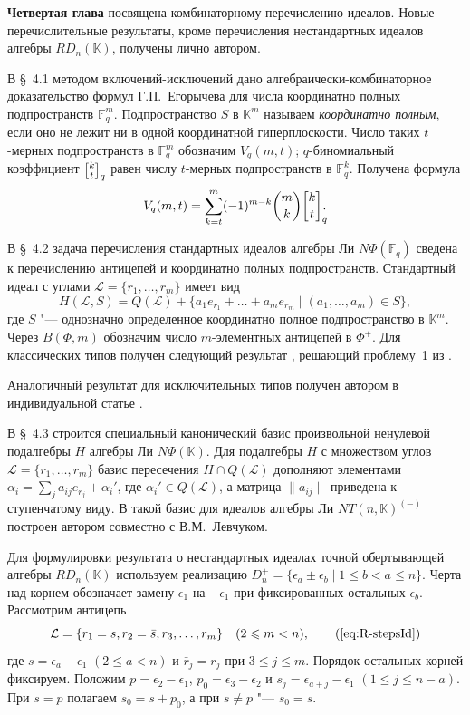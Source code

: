 \medskip

\textbf{Четвертая глава} посвящена комбинаторному перечислению идеалов.
Новые перечислительные результаты, кроме перечисления нестандартных идеалов
алгебры $RD_n(\mathbb{K})$, получены лично автором.

В \S~4.1 методом включений-исключений дано алгебраически-комбинаторное
доказательство формул Г.\:П.~Егорычева для числа координатно полных
подпространств $\mathbb{F}_q^m$. Подпространство $S$ в $\mathbb{K}^m$ называем
\emph{координатно полным}, если оно не лежит ни в одной координатной
гиперплоскости. Число таких $t$-мерных подпространств в $\mathbb{F}_q^m$
обозначим $V_q(m,t)$; $q$-биномиальный коэффициент $\qbinom{k}{t}$ равен числу
$t$-мерных подпространств в $\mathbb{F}_q^k$. Получена формула
\cite[лемма~2.3]{smj2023}
\[
    V_q(m,t) = \sum_{k=t}^{m} (-1)^{m-k} \binom{m}{k} \qbinom{k}{t}[\mathrlap].
\]

В \S~4.2 задача перечисления стандартных идеалов алгебры Ли
$N\Phi(\mathbb{F}_q)$ сведена к перечислению антицепей и координатно полных
подпространств. Стандартный идеал с углами $\mathcal{L}=\{r_1,\ldots,r_m\}$
имеет вид
\[
    H(\mathcal{L},S)=Q(\mathcal{L})+\{a_1e_{r_1}+\dots+a_me_{r_m}\mid
    (a_1,\dots,a_m)\in S\},
\]
где $S$ "--- однозначно определенное координатно полное подпространство в
$\mathbb{K}^m$. Через $B(\Phi,m)$ обозначим число $m$-элементных антицепей в
$\Phi^+$. Для классических типов получен следующий результат
\cite[теорема~1]{smj2023}, решающий проблему~1 из \cite{sigsam2001}.


Аналогичный результат для исключительных типов получен автором в индивидуальной
статье \cite[теорема~2.1]{jsfu2018}.


В \S~4.3 строится специальный канонический базис произвольной ненулевой
подалгебры $H$ алгебры Ли $N\Phi(\mathbb{K})$. Для подалгебры $H$ с множеством
углов $\mathcal{L}=\{r_1,\ldots,r_m\}$ базис пересечения $H\cap Q(\mathcal{L})$
дополняют элементами $\alpha_i=\sum_j a_{ij}e_{r_j}+\alpha_i'$, где
$\alpha_i'\in Q(\mathcal{L})$, а матрица $\|a_{ij}\|$ приведена к ступенчатому
виду. В \cite[\S~4]{vmj2015} такой базис для идеалов алгебры Ли
$NT(n,\mathbb{K})^{(-)}$ построен автором совместно с В.\:М.~Левчуком.

Для формулировки результата о нестандартных идеалах точной обертывающей алгебры
$RD_n(\mathbb{K})$ используем реализацию
$D_n^+=\{\epsilon_a\pm\epsilon_b\mid1\leq b<a\leq n\}$. Черта над корнем
обозначает замену $\epsilon_1$ на $-\epsilon_1$ при фиксированных остальных
$\epsilon_b$. Рассмотрим антицепь
\begin{equation*}
    \mathcal{L}=\{r_1=s,r_2=\bar{s},r_3,\dots,r_m\}\quad(2\leq m<n),
    \tag{\ref*{eq:R-stepsId}}
\end{equation*}
где $s=\epsilon_a-\epsilon_1$ $(2\leq a<n)$ и $\bar{r}_j=r_j$ при
$3\leq j\leq m$. Порядок остальных корней фиксируем. Положим
$p=\epsilon_2-\epsilon_1$, $p_0=\epsilon_3-\epsilon_2$ и
$s_j=\epsilon_{a+j}-\epsilon_1$ $(1\leq j\leq n-a)$. При $s=p$ полагаем
$s_0=s+p_0$, а при $s\neq p$ "--- $s_0=s$.

